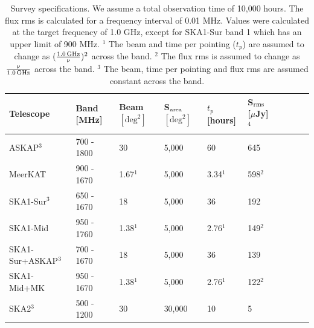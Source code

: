 \documentclass[useAMS,usenatbib]{mn2e}
\begin{document}
\begin{table}
\begin{center}
{\renewcommand{\arraystretch}{1.2} \begin{tabular}{ |l|l|l|l||l||l|l|l|l||l|}
\hline
 Telescope & Band [MHz] & Beam $[\mathrm{deg}^2]$ & S$_{\rm area}$ $[\mathrm{deg}^2]$ & $t_p$ [hours] & S$_{\rm rms}$ [$\mu$Jy]$^4$\\
 \hline
ASKAP$^3$ & 700 - 1800 & 30 & 5,000 & 60 & 645\\
MeerKAT & 900 - 1670 & 1.67$^1$ & 5,000 & 3.34$^1$ & 598$^2$\\
\hline
SKA1-Sur$^3$ & 650 - 1670 & 18 & 5,000 & 36 & 192\\
 SKA1-Mid & 950 - 1760 & 1.38$^1$ & 5,000 & 2.76$^1$ & 149$^2$\\
 SKA1-Sur+ASKAP$^3$ & 700 - 1670 & 18 & 5,000 & 36 & 139\\
SKA1-Mid+MK & 950 - 1670 & 1.38$^1$ & 5,000 & 2.76$^1$ & 122$^2$\\

\hline
SKA2$^3$ & 500 - 1200 & 30 & 30,000 & 10 & 5\\
\hline
\end{tabular} }
\end{center}
\vspace{-1.4em}\caption{Survey specifications. We assume a total observation time of 10,000 hours. The flux rms is calculated for a frequency interval of 0.01 MHz. Values were calculated at the target frequency of 1.0 GHz, except for SKA1-Sur band 1 which has an upper limit of 900 MHz.
$^1$ The beam and time per pointing ($t_p$) are assumed to change as $(\frac{1.0\, {\rm GHz}}{\nu})^2$ across the band.
$^2$ The flux rms is assumed to change as $\frac{\nu}{1.0\, {\rm GHz}}$ across the band.
$^3$ The beam, time per pointing and flux rms are assumed constant across the band.}
\label{tab:surveys}
\end{table}
\end{document}
